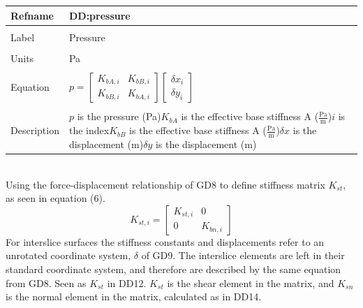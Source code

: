 \documentclass[12pt]{article}
\begin{document}
\noindent \begin{minipage}{\textwidth}
\begin{tabular}{p{} p{}}
\toprule \textbf{Refname} & \textbf{DD:pressure}
\label{DD:pressure}
\\ \midrule \\
Label & Pressure
\\ \midrule \\
Units & Pa
\\ \midrule \\
Equation & $p=\begin{bmatrix}
{K_{bA,i}} & {K_{bB,i}}\\
{K_{bB,i}} & {K_{bA,i}}
\end{bmatrix} \begin{bmatrix}
{\delta{}x}_{i}\\
{\delta{}y}_{i}
\end{bmatrix}$
\\ \midrule \\
Description & $p$ is the pressure (Pa)\newline${K_{bA}}$ is the effective base stiffness A ($\frac{\text{Pa}}{\text{m}}$)\newline$i$ is the index\newline${K_{bB}}$ is the effective base stiffness A ($\frac{\text{Pa}}{\text{m}}$)\newline$\delta{}x$ is the displacement (m)\newline$\delta{}y$ is the displacement (m)
\\ \bottomrule \end{tabular}
\end{minipage}\\
Using the force-displacement relationship of GD8 to define stiffness matrix ${K_{st}}$, as seen in equation (6).
\begin{dmath}
{K_{st,i}}=\begin{bmatrix}
{K_{st,i}} & 0\\
0 & {K_{bn,i}}
\end{bmatrix}
\end{dmath}
For interslice surfaces the stiffness constants and displacements refer to an unrotated coordinate system, $\delta{}$ of GD9. The interslice elements are left in their standard coordinate system, and therefore are described by the same equation from GD8. Seen as ${K_{st}}$ in DD12. ${K_{st}}$ is the shear element in the matrix, and ${K_{sn}}$ is the normal element in the matrix, calculated as in DD14.
\end{document}
